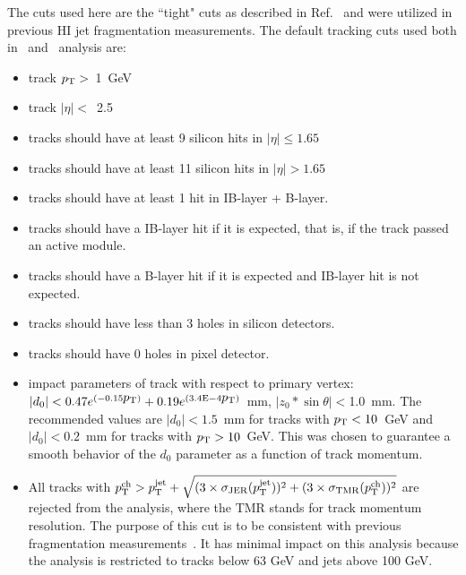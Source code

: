 The cuts used here are the ``tight" cuts as described in Ref.~\cite{ref:tracktwiki} and were utilized in previous HI jet fragmentation measurements.
The default tracking cuts used both in \pp\ and \PbPb\ analysis are:
\begin{itemize}
\item{ track $\mbox{$p_{\mathrm{T}}$}>$~1~GeV}
\item{ track $|\eta|<$~2.5}
\item{ tracks should have at least 9 silicon hits in $|\eta|\leq1.65$}
\item{ tracks should have at least 11 silicon hits in $|\eta|>1.65$}
\item{ tracks should have at least 1 hit in IB-layer + B-layer.}
\item{ tracks should have a IB-layer hit if it is expected, that is, if the track passed an active module.}
\item{ tracks should have a B-layer hit if it is expected and IB-layer hit is not expected.}
\item{ tracks should have  less than 3 holes in silicon detectors.}
\item{ tracks should have 0 holes in pixel detector.}
\item{ impact parameters of track with respect to primary vertex:  $|d_0| < 0.47 e^{(-0.15\mbox{$p_{\mathrm{T}}$})} + 0.19 e^{(3.4\rm{E-4}\mbox{$p_{\mathrm{T}}$})}$~mm, $|z_0*\sin\theta|<$1.0~mm.
The recommended values are  $|d_0| < 1.5$~mm for tracks with $\mbox{$p_{\mathrm{T}}$}<10$~GeV and $|d_0| < 0.2$~mm for tracks with $\mbox{$p_{\mathrm{T}}$}>10$~GeV.
This was chosen to guarantee a smooth behavior of the $d_{0}$ parameter as a function of track momentum.}
\item{All tracks with $\mbox{$p_{{\mathrm{T}}}^{\mathrm{ch}}$} >  \mbox{$p_{\mathrm{T}}^{\mathrm{jet}}$} + \sqrt{ (3 \times \sigma_{\mathrm{JER}}(\mbox{$p_{\mathrm{T}}^{\mathrm{jet}}$}))^2 + (3 \times \sigma_{\mathrm{TMR}}(\mbox{$p_{{\mathrm{T}}}^{\mathrm{ch}}$}))^2} $
are rejected from the analysis, where the TMR stands for track momentum resolution.
The purpose of this cut is to be consistent with previous fragmentation measurements~\cite{PhysRevC.98.024908}.
It has minimal impact on this analysis because the analysis is restricted to tracks below 63 GeV and jets above 100 GeV.}
\end{itemize}


